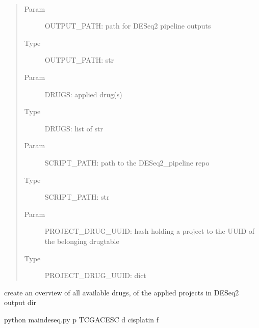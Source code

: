 \documentclass[letterpaper,10pt,english]{sphinxmanual}
\begin{document}
\label{\detokenize{index:module-walk_all_drug_frequency}}

\begin{fulllineitems}
\label{\detokenize{index:walk_all_drug_frequency.drug_frequency}}~\begin{quote}\begin{description}
\item[{Param}] \leavevmode
\sphinxAtStartPar
OUTPUT\_PATH: path for DESeq2 pipeline outputs

\item[{Type}] \leavevmode
\sphinxAtStartPar
OUTPUT\_PATH: str

\item[{Param}] \leavevmode
\sphinxAtStartPar
DRUGS: applied drug(s)

\item[{Type}] \leavevmode
\sphinxAtStartPar
DRUGS: list of str

\item[{Param}] \leavevmode
\sphinxAtStartPar
SCRIPT\_PATH: path to the DESeq2\_pipeline repo

\item[{Type}] \leavevmode
\sphinxAtStartPar
SCRIPT\_PATH: str

\item[{Param}] \leavevmode
\sphinxAtStartPar
PROJECT\_DRUG\_UUID: hash holding a project to the UUID of the    belonging drugtable

\item[{Type}] \leavevmode
\sphinxAtStartPar
PROJECT\_DRUG\_UUID: dict

\end{description}\end{quote}

\sphinxAtStartPar
create an overview of all available drugs, of the applied projects in
DESeq2 output dir

\begin{sphinxVerbatim}[commandchars=\\\{\}]
\PYGZdl{} python main\PYGZus{}deseq.py \PYGZhy{}p TCGA\PYGZhy{}CESC \PYGZhy{}d cisplatin \PYGZhy{}f 
\end{sphinxVerbatim}

\end{fulllineitems}
\end{document}

